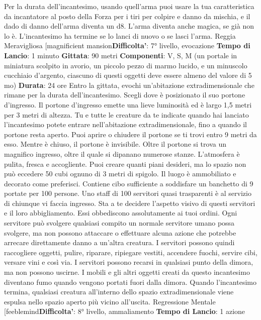 \begin{multicols}{2}
Per la durata dell’incantesimo, usando quell’arma puoi
usare la tua caratteristica da incantatore al posto della
Forza per i tiri per colpire e danno da mischia, e il dado
di danno dell’arma diventa un d8. L’arma diventa anche
magica, se già non lo è. L’incantesimo ha termine se lo
lanci di nuovo o se lasci l’arma.
Reggia Meravigliosa
[magnificient mansion\textbf{Difficolta'}:
7° livello, evocazione
\textbf{Tempo di Lancio}: 1 minuto
\textbf{Gittata}: 90 metri
\textbf{Componenti}: V, S, M (un portale in miniatura scolpito
in avorio, un piccolo pezzo di marmo lucido, e un
minuscolo cucchiaio d’argento, ciascuno di questi
oggetti deve essere almeno del valore di 5 mo)
\textbf{Durata}: 24 ore
Entro la gittata, evochi un’abitazione extradimensionale
che rimane per la durata dell’incantesimo. Scegli dove è
posizionato il suo portone d’ingresso. Il portone
d’ingresso emette una lieve luminosità ed è largo 1,5
metri per 3 metri di altezza. Tu e tutte le creature da te
indicate quando hai lanciato l’incantesimo potete
entrare nell’abitazione extradimensionale, fino a quando
il portone resta aperto. Puoi aprire o chiudere il portone
se ti trovi entro 9 metri da esso. Mentre è chiuso, il
portone è invisibile.
Oltre il portone si trova un magnifico ingresso, oltre il
quale si dipanano numerose stanze. L’atmosfera è
pulita, fresca e accogliente.
Puoi creare quanti piani desideri, ma lo spazio non può
eccedere 50 cubi ognuno di 3 metri di spigolo. Il luogo è
ammobiliato e decorato come preferisci. Contiene cibo
sufficiente a soddisfare un banchetto di 9 portate per
100 persone. Uno staff di 100 servitori quasi trasparenti
è al servizio di chiunque vi faccia ingresso. Sta a te
decidere l’aspetto visivo di questi servitori e il loro
abbigliamento. Essi obbediscono assolutamente ai tuoi
ordini. Ogni servitore può svolgere qualsiasi compito un
normale servitore umano possa svolgere, ma non
possono attaccare o effettuare alcuna azione che
potrebbe arrecare direttamente danno a un’altra
creatura. I servitori possono quindi raccogliere oggetti,
pulire, riparare, ripiegare vestiti, accendere fuochi,
servire cibi, versare vini e così via. I servitori possono
recarsi in qualsiasi punto della dimora, ma non possono
uscirne. I mobili e gli altri oggetti creati da questo
incantesimo diventano fumo quando vengono portati
fuori dalla dimora. Quando l’incantesimo termina,
qualsiasi creatura all’interno dello spazio
extradimensionale viene espulsa nello spazio aperto più
vicino all’uscita.
Regressione Mentale
[feeblemind\textbf{Difficolta'}:
8° livello, ammaliamento
\textbf{Tempo di Lancio}: 1 azione

\end{multicols}
